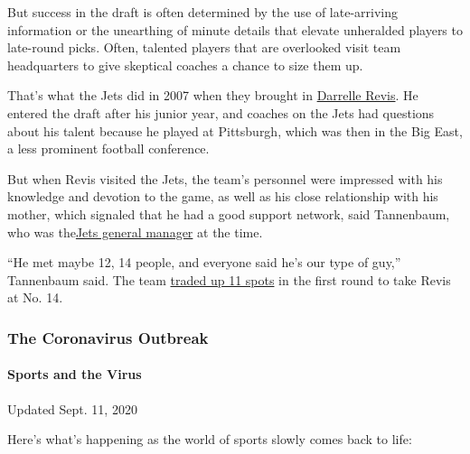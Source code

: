 But success in the draft is often determined by the use of late-arriving
information or the unearthing of minute details that elevate unheralded
players to late-round picks. Often, talented players that are overlooked
visit team headquarters to give skeptical coaches a chance to size them
up.

That's what the Jets did in 2007 when they brought in
\href{https://www.pro-football-reference.com/players/R/ReviDa99.htm}{Darrelle
Revis}. He entered the draft after his junior year, and coaches on the
Jets had questions about his talent because he played at Pittsburgh,
which was then in the Big East, a less prominent football conference.

But when Revis visited the Jets, the team's personnel were impressed
with his knowledge and devotion to the game, as well as his close
relationship with his mother, which signaled that he had a good support
network, said Tannenbaum, who was
the\href{https://www.pro-football-reference.com/executives/TannMi0.htm}{Jets
general manager} at the time.

``He met maybe 12, 14 people, and everyone said he's our type of guy,''
Tannenbaum said. The team
\href{https://www.nytimes3xbfgragh.onion/2007/04/29/sports/football/29jets.html}{traded
up 11 spots} in the first round to take Revis at No. 14.

\hypertarget{the-coronavirus-outbreak}{%
\subsubsection{The Coronavirus
Outbreak}\label{the-coronavirus-outbreak}}

\hypertarget{sports-and-the-virus}{%
\paragraph{Sports and the Virus}\label{sports-and-the-virus}}

Updated Sept. 11, 2020

Here's what's happening as the world of sports slowly comes back to
life:

